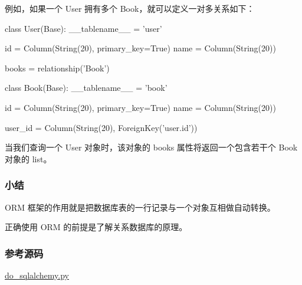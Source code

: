 例如，如果一个 User 拥有多个 Book，就可以定义一对多关系如下：

\begin{pythoncode}
class User(Base):
    __tablename__ = 'user'

    id = Column(String(20), primary_key=True)
    name = Column(String(20))
    
    books = relationship('Book')

class Book(Base):
    __tablename__ = 'book'

    id = Column(String(20), primary_key=True)
    name = Column(String(20))
    
    user_id = Column(String(20), ForeignKey('user.id'))
\end{pythoncode}

当我们查询一个 User 对象时，该对象的 books 属性将返回一个包含若干个 Book
对象的 list。

\hypertarget{ux5c0fux7ed3}{%
\subsubsection{小结}\label{ux5c0fux7ed3}}

ORM 框架的作用就是把数据库表的一行记录与一个对象互相做自动转换。

正确使用 ORM 的前提是了解关系数据库的原理。

\hypertarget{ux53c2ux8003ux6e90ux7801}{%
\subsubsection{参考源码}\label{ux53c2ux8003ux6e90ux7801}}

\href{https://github.com/michaelliao/learn-python3/blob/master/samples/db/do_sqlalchemy.py}{do\_sqlalchemy.py}

